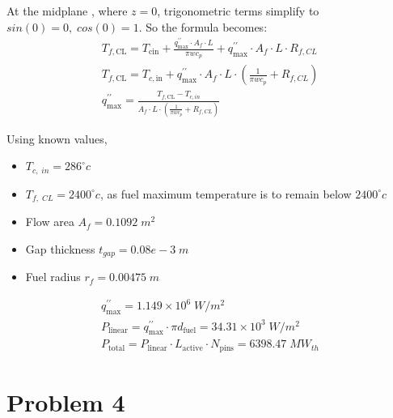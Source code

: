 \documentclass[12pt]{article}
\begin{document}
\begin{enumerate}
At the midplane , where $z=0$, trigonometric terms simplify to $sin (0)=0, \; cos(0) = 1$. So the formula becomes:
\begin{equation*}
    \begin{gathered}
        T_{f,{\mathrm{C L}}}=T_{\mathrm{cin}}+{\frac{q_{\mathrm{max}}^{\prime\prime}\cdot A_{f}\cdot L}{\pi w c_{p}}}+q_{\mathrm{max}}^{\prime\prime}\cdot A_{f}\cdot L\cdot R_{f,C L} \\
        T_{f,\mathrm{C L}}=T_{c,\mathrm{in}}+q_{\mathrm{max}}^{\prime\prime}\cdot A_{f}\cdot L\cdot\left({\frac{1}{\pi w c_{p}}}+R_{f,C L}\right) \\
        q_{\mathrm{max}}^{\prime\prime}={\frac{T_{f,\mathrm{C L}}-T_{c, i n}}{A_{f}\cdot L\cdot\left({\frac{1}{\pi w c_{p}}}+R_{f,C L}\right)}}
    \end{gathered}
\end{equation*}

Using known values,
\begin{itemize}
    \item $T_{c , \; in} = 286 ^{\circ} c$
    \item $T_{f, \; CL} = 2400 ^{\circ} c$, as fuel maximum temperature is to remain below $2400 ^{\circ} c$
    \item Flow area $A_f = 0.1092 \; m^2$
    \item Gap thickness $t_{gap} = 0.08e-3 \; m$
    \item Fuel radius $r_f = 0.00475 \; m$
\end{itemize}

\begin{equation}
    \begin{gathered}
        q_{\mathrm{max}}^{\prime\prime}= 1.149 \times 10^6 \; W/m^2 \\
        P_{\mathrm{linear}}=q_{\mathrm{max}}^{\prime \prime}\cdot\pi d_{\mathrm{fuel}} = 34.31 \times 10^3 \; W/m^2 \\
        P_{\mathrm{total}}=P_{\mathrm{linear}}\cdot L_{\mathrm{active}}\cdot N_{\mathrm{pins}} = \boxed{6398.47 \; MW_{th}}
    \end{gathered}
\end{equation}
\end{enumerate}


\section*{Problem 4}
\end{document}
